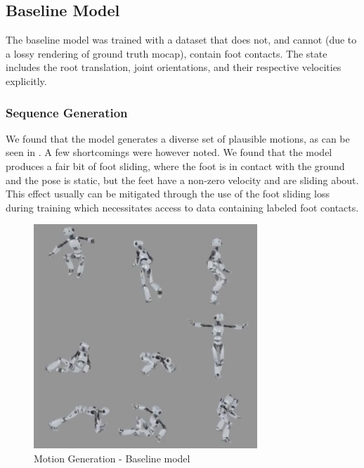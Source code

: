 \subsection{Baseline Model}
\label{sec:baseline_evaluation}
The baseline model was trained with a dataset that does not, and cannot (due to a lossy rendering of ground truth mocap), contain foot contacts. The state includes the root translation, joint orientations, and their respective velocities explicitly.

\subsubsection{Sequence Generation}
We found that the model generates a diverse set of plausible motions, as can be seen in . A few shortcomings were however noted. We found that the model produces a fair bit of foot sliding, where the foot is in contact with the ground and the pose is static, but the feet have a non-zero velocity and are sliding about. This effect usually can be mitigated through the use of the foot sliding loss during training which necessitates access to data containing labeled foot contacts.

\begin{figure}[!ht]
    \centering
    \includegraphics[width=0.75\textwidth]{Figures/diffusion/results/baseline_generation.png}
    \caption{Motion Generation - Baseline model}
    \label{fig:baseline_generation}
\end{figure}

